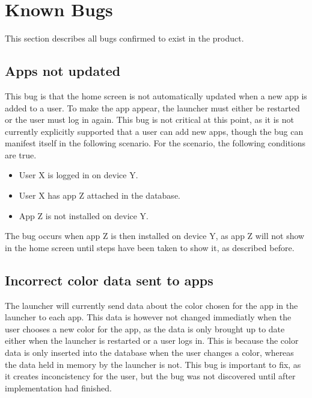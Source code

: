 \section{Known Bugs}
This section describes all bugs confirmed to exist in the product. 

\subsection{Apps not updated}
This bug is that the home screen is not automatically updated when a new app is added to a user. 
To make the app appear, the launcher must either be restarted or the user must log in again. 
This bug is not critical at this point, as it is not currently explicitly supported that a user can add new apps, though the bug can manifest itself in the following scenario.\newline
For the scenario, the following conditions are true.

\begin{itemize}
	\item User X is logged in on device Y.
	\item User X has app Z attached in the database. 
	\item App Z is not installed on device Y.
\end{itemize}

The bug occurs when app Z is then installed on device Y, as app Z will not show in the home screen until steps have been taken to show it, as described before. 

\subsection{Incorrect color data sent to apps}
The launcher will currently send data about the color chosen for the app in the launcher to each app. 
This data is however not changed immediatly when the user chooses a new color for the app, as the data is only brought up to date either when the launcher is restarted or a user logs in. 
This is because the color data is only inserted into the database when the user changes a color, whereas the data held in memory by the launcher is not. 
This bug is important to fix, as it creates inconcistency for the user, but the bug was not discovered until after implementation had finished. 